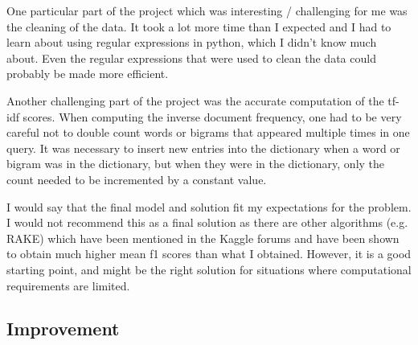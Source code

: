 \documentclass{article}
\begin{document}
One particular part of the project which was interesting / challenging for me
was the cleaning of the data. It took a lot more time than I expected and I
had to learn about using regular expressions in python, which I didn't know
much about. Even the regular expressions that were used to clean the data
could probably be made more efficient.

Another challenging part of the project was the accurate computation of the
tf-idf scores. When computing the inverse document frequency, one had to be
very careful not to double count words or bigrams that appeared multiple times
in one query. It was necessary to insert new entries into the dictionary when
a word or bigram was in the dictionary, but when they were in the dictionary,
only the count needed to be incremented by a constant value.

I would say that the final model and solution fit my expectations for the
problem. I would not recommend this as a final solution as there are other
algorithms (e.g. RAKE) which have been mentioned in the Kaggle forums and have
been shown to obtain much higher mean f1 scores than what I obtained. However,
it is a good starting point, and might be the right solution for situations
where computational requirements are limited.



\subsection{Improvement}
\end{document}
